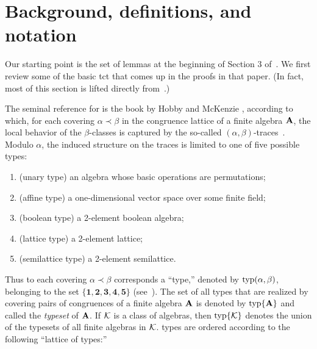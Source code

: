
\section{Background, definitions, and notation}
\label{sec:defin-notat}
Our starting point is the set of lemmas at the beginning of Section 3 of~\cite{Freese:2009}.
We first review some of the basic \ac{tct}
that comes up in the proofs in that paper. (In fact, most of this section 
is lifted directly from~\cite[Section~2]{Freese:2009}.)

The seminal reference for \tct is the book by Hobby and McKenzie
\cite{HM:1988}, according to which,
for each covering $\alpha \prec \beta$ in the congruence lattice of a finite
algebra $\mathbf{A}$, the local behavior of the $\beta$-classes is captured by the
so-called $(\alpha, \beta)$-traces~\cite[Def.~2.15]{HM:1988}.
Modulo $\alpha$, the induced structure on the traces is limited to one
of five possible types:

\begin{enumerate}[{\bf 1}]
\item  (unary type) an algebra whose basic operations are permutations;
\item  (affine type) a one-dimensional vector space over some finite field;
\item  (boolean type) a 2-element boolean algebra;
\item  (lattice type) a 2-element lattice;
\item  (semilattice type) a 2-element semilattice.
\end{enumerate}

Thus to each covering $\alpha \prec \beta$
corresponds a ``\tct type,'' denoted by $\operatorname{typ}(\alpha, \beta)$,
belonging to the set 
$\{\mathbf{1},\mathbf{2},\mathbf{3},\mathbf{4},\mathbf{5}\}$ 
(see~\cite[Def.~5.1]{HM:1988}).
The set of all \tct types that are realized by covering pairs of congruences of a
finite algebra $\mathbf{A}$ is denoted by $\operatorname{typ}\{\mathbf{A}\}$ 
and called the \emph{typeset} of $\mathbf{A}$.
If $\mathcal{K}$ is a class of algebras, then $\operatorname{typ}\{\mathcal{K}\}$ denotes the union of the typesets of all finite algebras in $\mathcal{K}$.
\tct types are ordered according to the following ``lattice of types:''

